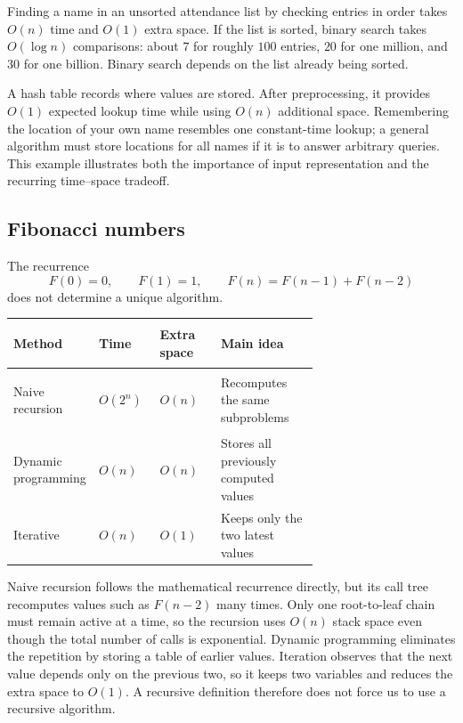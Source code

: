 \documentclass[11pt]{article}
\begin{document}
Finding a name in an unsorted attendance list by checking entries in order takes
$O(n)$ time and $O(1)$ extra space. If the list is sorted, binary search takes
$O(\log n)$ comparisons: about $7$ for roughly $100$ entries, $20$ for one
million, and $30$ for one billion. Binary search depends on the list already
being sorted.

A hash table records where values are stored. After preprocessing, it provides
$O(1)$ expected lookup time while using $O(n)$ additional space. Remembering the
location of your own name resembles one constant-time lookup; a general
algorithm must store locations for all names if it is to answer arbitrary
queries. This example illustrates both the importance of input representation
and the recurring time--space tradeoff.

\subsection{Fibonacci numbers}

The recurrence
\[
F(0)=0,\qquad F(1)=1,\qquad F(n)=F(n-1)+F(n-2)
\]
does not determine a unique algorithm.

\begin{center}
\begin{tabularx}{0.94\linewidth}{>{\bfseries\raggedright\arraybackslash}p{0.28\linewidth}>{\raggedright\arraybackslash}p{0.20\linewidth}>{\raggedright\arraybackslash}p{0.20\linewidth}>{\raggedright\arraybackslash}X}
\toprule
Method & Time & Extra space & Main idea \\
\midrule
Naive recursion & $O(2^n)$ & $O(n)$ & Recomputes the same subproblems \\
Dynamic programming & $O(n)$ & $O(n)$ & Stores all previously computed values \\
Iterative & $O(n)$ & $O(1)$ & Keeps only the two latest values \\
\bottomrule
\end{tabularx}
\end{center}

Naive recursion follows the mathematical recurrence directly, but its call tree
recomputes values such as $F(n-2)$ many times. Only one root-to-leaf chain must
remain active at a time, so the recursion uses $O(n)$ stack space even though
the total number of calls is exponential. Dynamic programming eliminates the
repetition by storing a table of earlier values. Iteration observes that the
next value depends only on the previous two, so it keeps two variables and
reduces the extra space to $O(1)$. A recursive definition therefore does not
force us to use a recursive algorithm.
\end{document}

